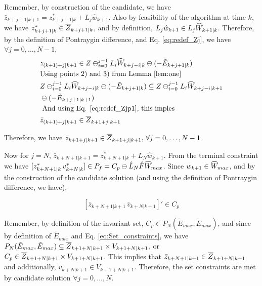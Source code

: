 Remember, by construction of the candidate, we have $\bar{z}_{k+j+1|k+1} = z^{*}_{k+j+1|k} + L_j\hat{w}_{k+1}$.
Also by feasibility of the algorithm at time $k$, we have $z^{*}_{k+j+1|k}\in \overline{Z}_{k+j+1|k}$, and by definition, $L_j\hat{w}_{k+1} \in L_j\widehat{W}_{k+1|k}$. Therefore, by the definition of Pontraygin difference, and Eq. \ref{eq:redef_Zj}, we have $\forall j=0,\dotsc,N-1$,
\begin{subequations}
\begin{align}
&\bar{z}_{(k+1)+j|k+1} \in Z \ominus_{i=0}^{j-1}L_i\widehat{W}_{k+j-i|k} \ominus (-\tilde{E}_{k+j+1|k}) \\
&\text{Using points 2) and 3) from Lemma \ref{lem:one} } \nonumber \\ 
&Z \ominus_{i=0}^{j-1}L_i\widehat{W}_{k+j-i|k} \ominus (-\tilde{E}_{k+j+1|k}) \subseteq Z \ominus_{i=0}^{j-1}L_i\widehat{W}_{k+j-i|k+1}  \nonumber \\
& \ominus (-\tilde{E}_{k+j+1|k+1}) \\
&\text{ And using Eq. \ref{eq:redef_Zjp1}, this imples } \nonumber \\
&\bar{z}_{(k+1)+j|k+1} \in \overline{Z}_{k+1+j|k+1}
\end{align} 
\end{subequations}

Therefore, we have $\bar{z}_{k+1+j|k+1} \in \overline{Z}_{k+1+j|k+1},\,\forall j=0,\dotsc,N-1$. 

Now for $j=N$, $\bar{z}_{k+N+1|k+1} = z^{*}_{k+N+1|k} + L_N\hat{w}_{k+1}$. From the terminal constraint we have $[z^{*}_{k+N+1|k}\, v^{*}_{k+N|k}] \in P_f = C_p \ominus \hat{L}_N\hat{F}\widehat{W}_{max}$. Since $w_{k+1} \in \widehat{W}_{max}$, and by the construction of the candidate solution (and using the definition of Pontraygin difference, we have), 

\begin{equation}
\label{eq:CandidateInC}
[\bar{z}_{k+N+1|k+1}\, \bar{v}_{k+N|k+1}]' \in C_p
\end{equation}

Remember, by definition of the invariant set, $C_p \in P_N(\tilde{E}_{max},\tilde{E}_{max})$, and since by definition of $\tilde{E}_{max}$ and Eq. \ref{eq:Set_constraints}, we have $P_N(\tilde{E}_{max},\tilde{E}_{max}) \subseteq \overline{Z}_{k+1+N|k+1} \times V_{k+1+N|k+1}$, or $C_p \in  \overline{Z}_{k+1+N|k+1} \times {V}_{k+1+N|k+1}$. This implies that $\bar{z}_{k+N+1|k+1} \in \overline{Z}_{k+1+N|k+1}$ and additionally, $v_{k+N|k+1} \in {V}_{k+1+N|k+1}$.
Therefore, the set constraints are met by candidate solution $\forall j=0,\dotsc,N$. 

